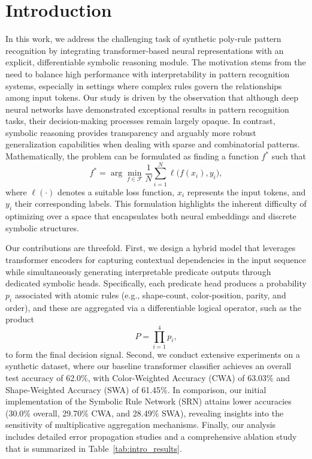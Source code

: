 \documentclass[11pt]{article}
\begin{document}
\section{Introduction}
In this work, we address the challenging task of synthetic poly‐rule pattern recognition by integrating transformer-based neural representations with an explicit, differentiable symbolic reasoning module. The motivation stems from the need to balance high performance with interpretability in pattern recognition systems, especially in settings where complex rules govern the relationships among input tokens. Our study is driven by the observation that although deep neural networks have demonstrated exceptional results in pattern recognition tasks, their decision-making processes remain largely opaque. In contrast, symbolic reasoning provides transparency and arguably more robust generalization capabilities when dealing with sparse and combinatorial patterns. Mathematically, the problem can be formulated as finding a function \( f^\ast \) such that
\[
f^\ast = \arg \min_{f \in \mathcal{F}} \frac{1}{N}\sum_{i=1}^{N} \ell\big(f(x_i), y_i\big),
\]
where \( \ell(\cdot) \) denotes a suitable loss function, \( x_i \) represents the input tokens, and \( y_i \) their corresponding labels. This formulation highlights the inherent difficulty of optimizing over a space that encapsulates both neural embeddings and discrete symbolic structures.

Our contributions are threefold. First, we design a hybrid model that leverages transformer encoders for capturing contextual dependencies in the input sequence while simultaneously generating interpretable predicate outputs through dedicated symbolic heads. Specifically, each predicate head produces a probability \( p_i \) associated with atomic rules (e.g., shape-count, color-position, parity, and order), and these are aggregated via a differentiable logical operator, such as the product
\[
P = \prod_{i=1}^{4} p_i,
\]
to form the final decision signal. Second, we conduct extensive experiments on a synthetic dataset, where our baseline transformer classifier achieves an overall test accuracy of 62.0\%, with Color-Weighted Accuracy (CWA) of 63.03\% and Shape-Weighted Accuracy (SWA) of 61.45\%. In comparison, our initial implementation of the Symbolic Rule Network (SRN) attains lower accuracies (30.0\% overall, 29.70\% CWA, and 28.49\% SWA), revealing insights into the sensitivity of multiplicative aggregation mechanisms. Finally, our analysis includes detailed error propagation studies and a comprehensive ablation study that is summarized in Table~\ref{tab:intro_results}.
\end{document}
